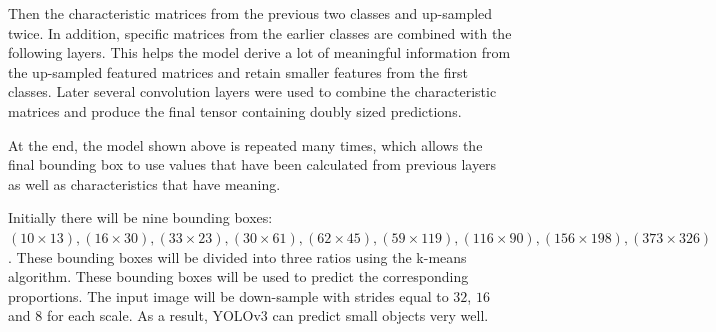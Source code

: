 \documentclass[conference]{IEEEtran}
\begin{document}
Then the characteristic matrices from the previous two classes and up-sampled twice. In addition, specific matrices from the earlier classes are combined with the following layers. This helps the model derive a lot of meaningful information from the up-sampled featured matrices and retain smaller features from the first classes. Later several convolution layers were used to combine the characteristic matrices and produce the final tensor containing doubly sized predictions.

At the end, the model shown above is repeated many times, which allows the final bounding box to use values that have been calculated from previous layers as well as characteristics that have meaning.

Initially there will be nine bounding boxes: $ (10 \times 13), (16 \times 30), (33 \times 23), (30 \times 61), (62 \times 45), (59 \times 119) , (116 \times 90), (156 \times 198), (373 \times 326) $. These bounding boxes will be divided into three ratios using the k-means algorithm. These bounding boxes will be used to predict the corresponding proportions. The input image will be down-sample with strides equal to $ 32 $, $ 16 $ and $ 8 $ for each scale. As a result, YOLOv3 can predict small objects very well.
\end{document}
